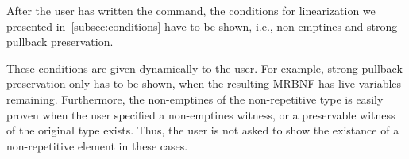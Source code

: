     After the user has written the command, the conditions for linearization we presented in~\autoref{subsec:conditions} have to be shown, i.e., non-emptines and strong pullback preservation. 
    
    These conditions are given dynamically to the user. For example, strong pullback preservation only has to be shown, when the resulting \ac{MRBNF} has live variables remaining. Furthermore, the non-emptines of the non-repetitive type is easily proven when the user specified a non-emptines witness, or a preservable witness of the original type exists. Thus, the user is not asked to show the existance of a non-repetitive element in these cases.

    
    

    

  